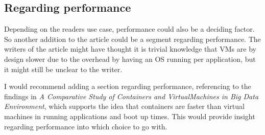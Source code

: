 \documentclass{article}
\begin{document}
\subsection{Regarding performance}
Depending on the readers use case, performance could also be a deciding factor. So another addition to the article could be a segment regarding performance.  The writers of the article might have thought it is trivial knowledge that VMs are by design slower due to the overhead by having an OS running per application, but it might still be unclear to the writer. 

I would recommend adding a section regarding performance, referencing to the findings in \emph{A Comparative Study of Containers and VirtualMachines in Big Data Environment}, which supports the idea that containers are faster than virtual machines in running applications and boot up times.\cite{benchmarks} This would provide insight regarding performance into which choice to go with.

\printbibliography
\end{document}
